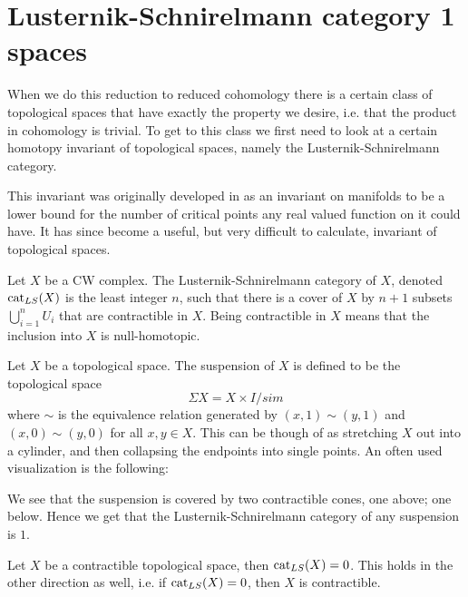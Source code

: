 \section{Lusternik-Schnirelmann category 1 spaces}

When we do this reduction to reduced cohomology there is a certain class of topological spaces that have exactly the property we desire, i.e. that the product in cohomology is trivial. To get to this class we first need to look at a certain homotopy invariant of topological spaces, namely the Lusternik-Schnirelmann category. 

This invariant was originally developed in \cite{lscat} as an invariant on manifolds to be a lower bound for the number of critical points any real valued function on it could have. It has since become a useful, but very difficult to calculate, invariant of topological spaces. 

\begin{definition}
Let $X$ be a CW complex. The Lusternik-Schnirelmann category of $X$, denoted $\text{cat}_{LS}(X)$ is the least integer $n$, such that there is a cover of $X$ by $n+1$ subsets $\bigcup_{i=1}^n U_i$ that are contractible in $X$. Being contractible in $X$ means that the inclusion into $X$ is null-homotopic. 
\end{definition}

\begin{example}
Let $X$ be a topological space. The suspension of $X$ is defined to be the topological space
\begin{equation*}
	\Sigma X = X\times I/sim
\end{equation*}
where $\sim$ is the equivalence relation generated by $(x,1)\sim (y,1)$ and $(x,0)\sim (y,0)$ for all $x,y\in X$. This can be though of as stretching $X$ out into a cylinder, and then collapsing the endpoints into single points. An often used visualization is the following:
\begin{center}
\def\svgwidth{0.6\textwidth}

\end{center}
We see that the suspension is covered by two contractible cones, one above; one below. Hence we get that the Lusternik-Schnirelmann category of any suspension is $1$. 
\end{example}

\begin{example}
Let $X$ be a contractible topological space, then $\text{cat}_{LS}(X)=0$. This holds in the other direction as well, i.e. if $\text{cat}_{LS}(X)=0$, then $X$ is contractible.
\end{example}

